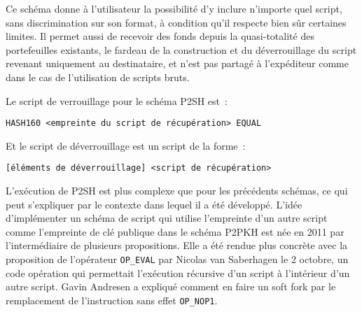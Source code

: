 
Ce schéma donne à l'utilisateur la possibilité d'y inclure n'importe quel script, sans discrimination sur son format, à condition qu'il respecte bien sûr certaines limites. Il permet aussi de recevoir des fonds depuis la quasi-totalité des portefeuilles existants, le fardeau de la construction et du déverrouillage du script revenant uniquement au destinataire, et n'est pas partagé à l'expéditeur comme dans le cas de l'utilisation de scripts bruts.

Le script de verrouillage pour le schéma P2SH est~:

\begin{Verbatim}[fontsize=\footnotesize]
HASH160 <empreinte du script de récupération> EQUAL
\end{Verbatim}

Et le script de déverrouillage est un script de la forme~:

\begin{Verbatim}[fontsize=\footnotesize]
[éléments de déverrouillage] <script de récupération>
\end{Verbatim}

L'exécution de P2SH est plus complexe que pour les précédents schémas, ce qui peut s'expliquer par le contexte dans lequel il a été développé. L'idée d'implémenter un schéma de script qui utilise l'empreinte d'un autre script comme l'empreinte de clé publique dans le schéma P2PKH est née en 2011 par l'intermédiaire de plusieurs propositions. Elle a été rendue plus concrète avec la proposition de l'opérateur \texttt{OP\_EVAL} par Nicolas van Saberhagen le 2 octobre, un code opération qui permettait l'exécution récursive d'un script à l'intérieur d'un autre script. Gavin Andresen a expliqué comment en faire un soft fork par le remplacement de l'instruction sans effet \texttt{OP\_NOP1}.

